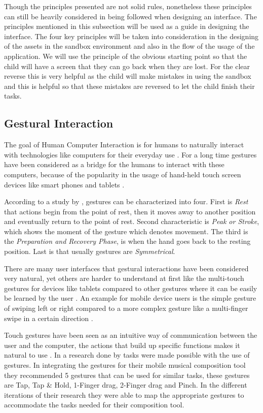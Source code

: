 Though the principles presented are not solid rules, nonetheless these principles can still be heavily considered in being followed when designing an interface. The principles mentioned in this subsection will be used as a guide in designing the interface. The four key principles will be taken into consideration in the designing of the assets in the sandbox environment and also in the flow of the usage of the application. We will use the principle of the obvious starting point so that the child will have a screen that they can go back when they are lost. For the clear reverse this is very helpful as the child will make mistakes in using the sandbox and this is helpful so that these mistakes are reversed to let the child finish their tasks. 

\subsection{Gestural Interaction}
The goal of Human Computer Interaction is for humans to naturally interact with technologies like computers for their everyday use \cite{hasan2012human,rautaray2015vision}. For a long time gestures have been considered as a bridge for the humans to interact with these computers, because of the popularity in the usage of hand-held touch screen devices like smart phones and tablets \cite{ruiz2011user,hasan2012human}.

According to a study by , gestures can be characterized into four. First is \textit{Rest} that actions begin from the point of rest, then it moves away to another position and eventually return to the point of rest. Second characteristic is \textit{Peak or Stroke}, which shows the moment of the gesture which denotes movement. The third is the \textit{Preparation and Recovery Phase}, is when the hand goes back to the resting position. Last is that usually gestures are \textit{Symmetrical}.

There are many user interfaces that gestural interactions have been considered very natural, yet others are harder to understand at first like the multi-touch gestures for devices like tablets compared to other gestures where it can be easily be learned by the user \cite{mortensen_2019}. An example for mobile device users is the simple gesture of swiping left or right compared to a more complex gesture like a multi-finger swipe in a certain direction \cite{mortensen_2019}.

Touch gestures have been seen as an intuitive way of communication between the user and the computer, the actions that build up specific functions makes it natural to use \cite{rautaray2015vision}. In a research done by  tasks were made possible with the use of gestures. In integrating the gestures for their mobile musical composition tool they recommended 5 gestures that can be used for similar tasks, these gestures are Tap, Tap \& Hold, 1-Finger drag, 2-Finger drag and Pinch. In the different iterations of their research they were able to map the appropriate gestures to accommodate the tasks needed for their composition tool.  

